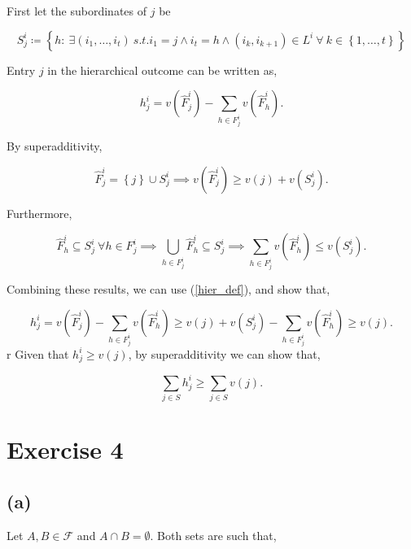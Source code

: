 \documentclass[american]{scrartcl}
\newcommand{\set}[1]{\left\{#1\right\}}
\begin{document}
First let the subordinates of $j$ be

\begin{equation}
    S^i_{j} \coloneqq \set{h: \ \exists (i_1, \dots, i_t) \ s.t. i_1 = j \land i_t = h \land (i_k, i_{k+1}) \in L^i \ \forall  \ k \in \set{1, \dots, t}}
\end{equation}

Entry $j$ in the hierarchical outcome can be written as,

\begin{equation} \label{hier_def}
    h^i_{j} = v(\hat{F}^i_j) - \sum_{h \in F^i_j}  v(\hat{F}^i_h).
\end{equation}

By superadditivity,

\begin{equation}
    \hat{F}^i_j = \set{j} \cup S^i_{j} \implies v(\hat{F}^i_j ) \geq v(j) + v(S^i_{j}).
\end{equation}

Furthermore,

\begin{equation}
    \hat{F}^i_h \subseteq S^i_{j} \ \forall h \in F^i_j \implies \bigcup_{h \in F^i_j} \hat{F}^i_h \subseteq S^i_{j} \implies \sum_{h \in F^i_j}  v(\hat{F}^i_h) \leq v(S^i_{j}).
\end{equation}

Combining these results, we can use (\ref{hier_def}), and show that,

\begin{equation}
    h^i_{j} = v(\hat{F}^i_j) - \sum_{h \in F^i_j}  v(\hat{F}^i_h) \geq v(j) + v(S^i_{j}) - \sum_{h \in F^i_j}  v(\hat{F}^i_h) \geq v(j).
\end{equation}
r
Given that $h^i_{j} \geq v(j)$, by superadditivity we can show that,

\begin{equation}
    \sum_{j \in S} h^i_{j} \geq \sum_{j \in S} v(j). %
\end{equation}


\section*{Exercise 4}

\subsection*{(a)}

\iffalse
    Let $A, B \in \mathcal{F}$ and $A \cap B = \emptyset$. Both sets are such that,
\end{document}
